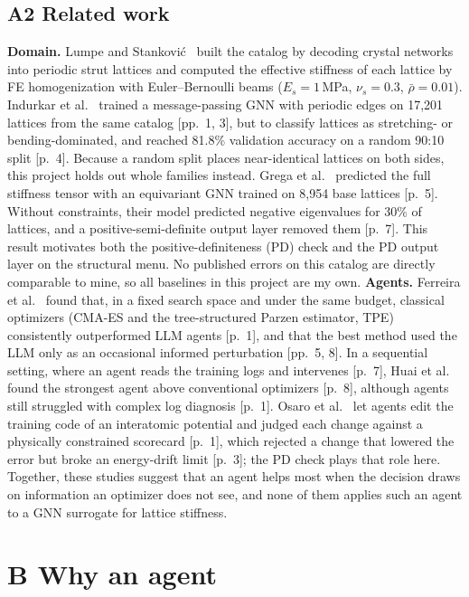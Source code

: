 \documentclass[11pt]{article}
\newcommand{\rhob}{\bar{\rho}}
\begin{document}
\subsection*{A2 \quad Related work}
\textbf{Domain.} Lumpe and Stankovi\'c~\cite{lumpe} built the catalog by decoding crystal networks
into periodic strut lattices and computed the effective stiffness of each lattice by FE
homogenization with Euler--Bernoulli beams ($E_s = 1$\,MPa, $\nu_s = 0.3$, $\rhob = 0.01$).
Indurkar et al.~\cite{indurkar} trained a message-passing GNN with periodic edges on 17,201
lattices from the same catalog [pp.~1, 3], but to classify lattices as stretching- or
bending-dominated, and reached 81.8\% validation accuracy on a random 90:10 split [p.~4]. Because a
random split places near-identical lattices on both sides, this project holds out whole families
instead. Grega et al.~\cite{grega} predicted the full stiffness tensor with an equivariant GNN
trained on 8,954 base lattices [p.~5]. Without constraints, their model predicted negative
eigenvalues for 30\% of lattices, and a positive-semi-definite output layer removed them [p.~7].
This result motivates both the positive-definiteness (PD) check and the PD output layer on the
structural menu. No published errors on this catalog are directly comparable to mine, so all
baselines in this project are my own.
\textbf{Agents.} Ferreira et al.~\cite{ferreira} found that, in a fixed search space and under the
same budget, classical optimizers (CMA-ES and the tree-structured Parzen estimator, TPE)
consistently outperformed LLM agents [p.~1], and that the best method
used the LLM only as an occasional informed perturbation [pp.~5, 8]. In a sequential setting, where
an agent reads the training logs and intervenes [p.~7], Huai et al.~\cite{huai} found the strongest
agent above conventional optimizers [p.~8], although agents still struggled with complex log
diagnosis [p.~1]. Osaro et al.~\cite{osaro} let agents edit the training code of an interatomic
potential and judged each change against a physically constrained scorecard [p.~1], which rejected
a change that lowered the error but broke an energy-drift limit [p.~3]; the PD check plays that
role here. Together, these studies suggest that an agent helps most when the decision draws on
information an optimizer does not see, and none of them applies such an agent to a GNN surrogate
for lattice stiffness.

\section*{B \quad Why an agent}
\end{document}
